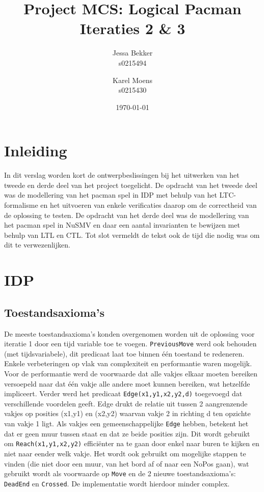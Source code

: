 \documentclass[a4paper,12pt]{article}
\title{Project MCS: Logical Pacman \\ Iteraties 2 \& 3}
\author{Jessa Bekker\\s0215494 \and Karel Moens \\ s0215430 }
\date{\today}
\begin{document}
\maketitle


\section{Inleiding}
In dit verslag worden kort de ontwerpbeslissingen bij het uitwerken van het tweede en derde deel van het project toegelicht.
De opdracht van het tweede deel was de modellering van het pacman spel  in IDP met behulp van het LTC-formalisme en het uitvoeren van enkele verificaties daarop om de correctheid van de oplossing te testen.
De opdracht van het derde deel was de modellering van het pacman spel in NuSMV en daar een aantal invarianten te bewijzen met behulp van LTL en CTL.
Tot slot vermeldt de tekst ook de tijd die nodig was om dit te verwezenlijken.

\section{IDP}
\subsection{Toestandsaxioma's}
De meeste toestandsaxioma's konden overgenomen worden uit de oplossing voor iteratie 1 door een tijd variable toe te voegen. \texttt{PreviousMove} werd ook behouden (met tijdsvariabele), dit predicaat laat toe binnen \'e\'en toestand te redeneren. Enkele verbeteringen op vlak van complexiteit en performantie waren mogelijk. Voor de performantie werd de voorwaarde dat alle vakjes elkaar moeten bereiken versoepeld naar dat \'e\'en vakje alle andere moet kunnen bereiken, wat hetzelfde impliceert. Verder werd het predicaat \texttt{Edge(x1,y1,x2,y2,d)} toegevoegd dat verschillende voordelen geeft. Edge drukt de relatie uit tussen 2 aangrenzende vakjes op posities (x1,y1) en (x2,y2) waarvan vakje 2 in richting d ten opzichte van vakje 1 ligt. Als vakjes een gemeenschappelijke \texttt{Edge} hebben, betekent het dat er geen muur tussen staat en dat ze beide posities zijn. Dit wordt gebruikt om \texttt{Reach(x1,y1,x2,y2)} effici\"enter na te gaan door enkel naar buren te kijken en niet naar eender welk vakje. Het 
wordt ook gebruikt om mogelijke stappen te vinden (die niet door een muur, van het bord af of naar een NoPos gaan), wat gebruikt wordt als voorwaarde op \texttt{Move} en de 2 nieuwe toestandsaxioma's: \texttt{DeadEnd} en \texttt{Crossed}. De implementatie wordt hierdoor minder complex.
\end{document}
